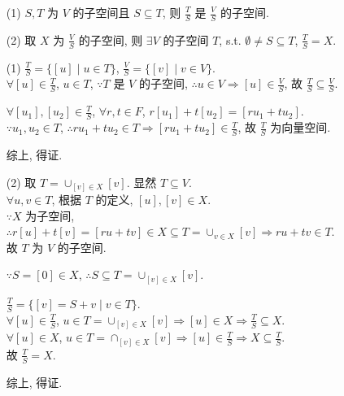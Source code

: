 \documentclass{note}
\begin{document}
\begin{thm}[(课本定理 3.3)]
    \begin{itemize}
        \item[(1)] $S,T$ 为 $V$ 的子空间且 $S\subseteq T$, 则 $\frac{T}{S}$ 是 $\frac{V}{S}$ 的子空间.
        \item[(2)] 取 $X$ 为 $\frac{V}{S}$ 的子空间, 则 $\exists V$ 的子空间 $T$, s.t. $\emptyset\neq S\subseteq T$, $\frac{T}{S}=X$.
    \end{itemize}
\end{thm}
\begin{pf}
    \begin{itemize}
        \item[(1)] $\frac{T}{S}=\{[u]\mid u\in T\}$, $\frac{V}{S}=\{[v]\mid v\in V\}$.\\
        $\forall[u]\in\frac{T}{S}$, $u\in T$, $\because T$ 是 $V$ 的子空间, $\therefore u\in V\Longrightarrow[u]\in\frac{V}{S}$, 故 $\frac{T}{S}\subseteq\frac{V}{S}$.

        $\forall[u_1],[u_2]\in\frac{T}{S}$, $\forall r,t\in F$, $r[u_1]+t[u_2]=[ru_1+tu_2]$.\\
        $\because u_1,u_2\in T$, $\therefore ru_1+tu_2\in T\Longrightarrow[ru_1+tu_2]\in\frac{T}{S}$, 故 $\frac{T}{S}$ 为向量空间.

        综上, 得证.
        \item[(2)] 取 $T=\cup_{[v]\in X}[v]$. 显然 $T\subseteq V$.\\
        $\forall u,v\in T$, 根据 $T$ 的定义, $[u],[v]\in X$.\\
        $\because X$ 为子空间, $\therefore r[u]+t[v]=[ru+tv]\in X\subseteq T=\cup_{v\in X}[v]\Longrightarrow ru+tv\in T$.\\
        故 $T$ 为 $V$ 的子空间.

        $\because S=[0]\in X$, $\therefore S\subseteq T=\cup_{[v]\in X}[v]$.

        $\frac{T}{S}=\{[v]=S+v\mid v\in T\}$.\\
        $\forall[u]\in\frac{T}{S}$, $u\in T=\cup_{[v]\in X}[v]\Longrightarrow[u]\in X\Longrightarrow\frac{T}{S}\subseteq X$.\\
        $\forall[u]\in X$, $u\in T=\cap_{[v]\in X}[v]\Longrightarrow[u]\in\frac{T}{S}\Longrightarrow X\subseteq\frac{T}{S}$.\\
        故 $\frac{T}{S}=X$.

        综上, 得证.
    \end{itemize}
\end{pf}
\end{document}
